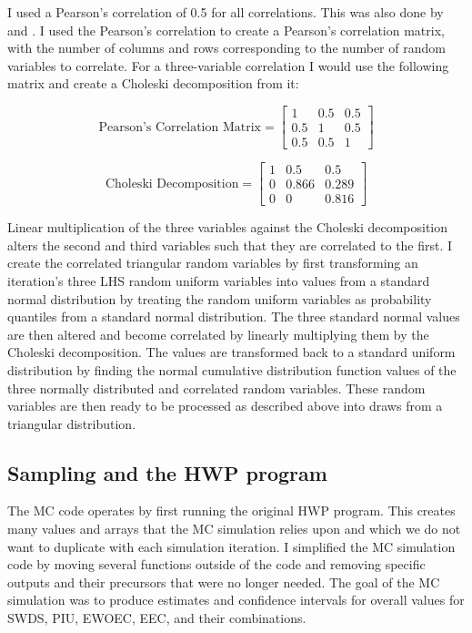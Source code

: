 \documentclass[
  openany]{book}
\begin{document}
I used a Pearson's correlation of 0.5 for all correlations. This was also done by \textcite{anderson2013} and \textcite{stockmann2012}. I used the Pearson's correlation to create a Pearson's correlation matrix, with the number of columns and rows corresponding to the number of random variables to correlate. For a three-variable correlation I would use the following matrix and create a Choleski decomposition from it:

\[ \text{Pearson's Correlation Matrix} = \begin{bmatrix}
       1 & 0.5 & 0.5           \\
       0.5 & 1  & 0.5 \\
       0.5 & 0.5 & 1
     \end{bmatrix}
\]

\[ \text{Choleski Decomposition} = \begin{bmatrix}
       1 & 0.5 & 0.5           \\
       0 & 0.866  & 0.289 \\
       0 & 0 & 0.816
     \end{bmatrix}
\]

Linear multiplication of the three variables against the Choleski decomposition alters the second and third variables such that they are correlated to the first. I create the correlated triangular random variables by first transforming an iteration's three LHS random uniform variables into values from a standard normal distribution by treating the random uniform variables as probability quantiles from a standard normal distribution. The three standard normal values are then altered and become correlated by linearly multiplying them by the Choleski decomposition. The values are transformed back to a standard uniform distribution by finding the normal cumulative distribution function values of the three normally distributed and correlated random variables. These random variables are then ready to be processed as described above into draws from a triangular distribution.

\hypertarget{model-mc-samphwp}{%
\subsection{Sampling and the HWP program}\label{model-mc-samphwp}}

The MC code operates by first running the original HWP program. This creates many values and arrays that the MC simulation relies upon and which we do not want to duplicate with each simulation iteration. I simplified the MC simulation code by moving several functions outside of the code and removing specific outputs and their precursors that were no longer needed. The goal of the MC simulation was to produce estimates and confidence intervals for overall values for SWDS, PIU, EWOEC, EEC, and their combinations.
\end{document}
